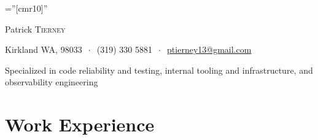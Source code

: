 \documentclass[letterpaper,10pt]{article} %
\begin{document}
\pagestyle{empty} %

\font\fb=''[cmr10]'' %

\begin{center}
{\Huge Patrick \textsc{Tierney}\bigskip }%

\vspace{-5mm}
Kirkland WA, 98033  $\ \cdot \ $
 (319) 330 5881 $\ \cdot \ $ 
\href{mailto:ptierney13@gmail.com}{ptierney13@gmail.com}


\vspace{-5mm}
\singlespacing

Specialized in code reliability and testing, internal tooling and infrastructure, and observability engineering

\end{center}





\section{Work Experience}
\end{document}
